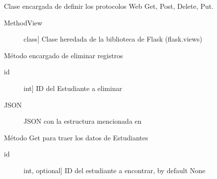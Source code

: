 \documentclass[a4paper,10pt,english]{sphinxmanual}
\begin{document}
\begin{fulllineitems}
\label{\detokenize{index:api3.student_api.api_student.ControllerStudent}}
\sphinxAtStartPar
Clase encargada de definir los protocolos Web Get, Post, Delete, Put.
\begin{description}
\item[{MethodView}] \leavevmode{[}class{]}
\sphinxAtStartPar
Clase heredada de la biblioteca de Flask (flask.views)

\end{description}

\begin{fulllineitems}
\label{\detokenize{index:api3.student_api.api_student.ControllerStudent.delete}}
\sphinxAtStartPar
Método encargado de eliminar registros
\begin{description}
\item[{id}] \leavevmode{[}int{]}
\sphinxAtStartPar
ID del Estudiante a eliminar

\end{description}
\begin{description}
\item[{JSON}] \leavevmode
\sphinxAtStartPar
JSON con la estructura mencionada en 

\end{description}

\end{fulllineitems}


\begin{fulllineitems}
\label{\detokenize{index:api3.student_api.api_student.ControllerStudent.get}}
\sphinxAtStartPar
Método Get para traer los datos de Estudiantes
\begin{description}
\item[{id}] \leavevmode{[}int, optional{]}
\sphinxAtStartPar
ID del estudiante a encontrar, by default None


\end{description}
\end{fulllineitems}
\end{fulllineitems}
\end{document}
